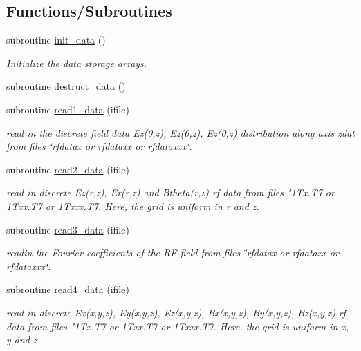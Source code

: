\subsection*{Functions/\+Subroutines}
\begin{DoxyCompactItemize}
\item 
subroutine \mbox{\hyperlink{namespacedataclass_a474ffe5e76484d63015aaf6255c27294}{init\+\_\+data}} ()
\begin{DoxyCompactList}\small\item\em Initialize the data storage arrays. \end{DoxyCompactList}\item 
subroutine \mbox{\hyperlink{namespacedataclass_ac5b255034c2a115b6740378b4d1e630e}{destruct\+\_\+data}} ()
\item 
subroutine \mbox{\hyperlink{namespacedataclass_a6733af7e3067d69140c61e2b4580a70b}{read1\+\_\+data}} (ifile)
\begin{DoxyCompactList}\small\item\em read in the discrete field data Ez(0,z), Ez\textquotesingle{}(0,z), Ez\textquotesingle{}\textquotesingle{}(0,z) distribution along axis zdat from files \char`\"{}rfdatax or rfdataxx 
 or rfdataxxx\char`\"{}. \end{DoxyCompactList}\item 
subroutine \mbox{\hyperlink{namespacedataclass_abf0c8413e040d7ea8c0bc5df73c9ef96}{read2\+\_\+data}} (ifile)
\begin{DoxyCompactList}\small\item\em read in discrete Ez(r,z), Er(r,z) and Btheta(r,z) rf data from files "1\+Tx.\+T7 or 1\+Txx.\+T7 or 1\+Txxx.\+T7. Here, the grid is uniform in r and z. \end{DoxyCompactList}\item 
subroutine \mbox{\hyperlink{namespacedataclass_a39afae6095340e01362de7d4876aee60}{read3\+\_\+data}} (ifile)
\begin{DoxyCompactList}\small\item\em readin the Fourier coefficients of the RF field from files \char`\"{}rfdatax or rfdataxx or rfdataxxx\char`\"{}. \end{DoxyCompactList}\item 
subroutine \mbox{\hyperlink{namespacedataclass_a2ef1f00ff4295094270a70c5d3763019}{read4\+\_\+data}} (ifile)
\begin{DoxyCompactList}\small\item\em read in discrete Ex(x,y,z), Ey(x,y,z), Ez(x,y,z), Bx(x,y,z), By(x,y,z), Bz(x,y,z) rf data from files "1\+Tx.\+T7 or 1\+Txx.\+T7 or 1\+Txxx.\+T7. Here, the grid is uniform in x, y and z. \end{DoxyCompactList}\item 

\end{DoxyCompactItemize}
